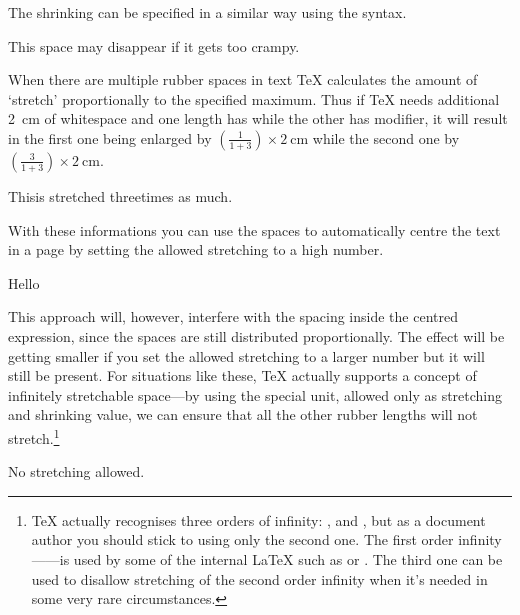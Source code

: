 The shrinking can be specified in a similar way using the  syntax.
\begin{example}
This\hspace{1em minus 2em}%
space may disappear if it gets
too crampy.
\end{example}

When there are multiple rubber spaces in text \TeX{} calculates the amount of
`stretch' proportionally to the specified maximum. Thus if \TeX{} needs
additional \qty{2}{\cm} of whitespace and one length has  while
the other has  modifier, it will result in the first one being
enlarged by \(\left(\frac{1}{1+3}\right) \times \qty{2}{\cm}\) while the second
one by \(\left(\frac{3}{1+3}\right) \times \qty{2}{\cm}\).
\begin{example}
This\hspace{0pt plus 3cm}is
stretched\hspace{0pt plus 1cm}%
three\linebreak times as much.
\end{example}

With these informations you can use the spaces to automatically centre the text
in a page by setting the allowed stretching to a high number.
\begin{example}
\hspace*{0pt plus 100cm}Hello
\hspace*{0pt plus 100cm}
\linebreak
\end{example}
This approach will, however, interfere with the spacing inside the centred
expression, since the spaces are still distributed proportionally. The effect
will be getting smaller if you set the allowed stretching to a larger number
but it will still be present. For situations like these, \TeX{} actually
supports a concept of infinitely stretchable space---by using the special
 unit, allowed only as stretching and shrinking value, we can
ensure that all the other rubber lengths will not stretch.\footnote{\TeX{}
  actually recognises three orders of infinity: ,  and
  , but as a document author you should stick to using only the
  second one. The first order infinity------is used by some of the
  internal \LaTeX{} such as \cs{\bs} or . The third one can be used
  to disallow stretching of the second order infinity when it's needed in some
  very rare circumstances.}
\begin{example}
\hspace*{0pt plus 1fill}%
No\hspace{0pt plus 100cm}
stretching allowed.%
\hspace*{0pt plus 1fill}%
\linebreak
\end{example}

